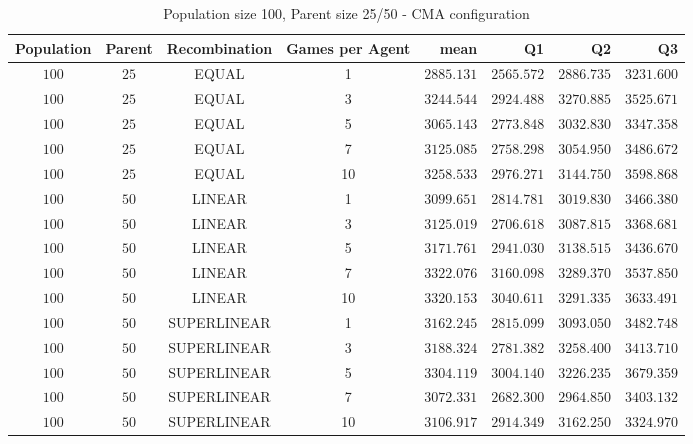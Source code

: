\begin{table}[H]
\centering
\small
\begin{tabular}{c c c c r r r r}
Population & Parent & Recombination & Games per Agent & mean & Q1 & Q2 & Q3\\
\hline
$100$ & $25$ & EQUAL & 1 & $2885.131$ & $2565.572$ & $2886.735$ & $3231.600$\\
\hdashline
$100$ & $25$ & EQUAL & 3 & $3244.544$ & $2924.488$ & $3270.885$ & $3525.671$\\
\hdashline
$100$ & $25$ & EQUAL & 5 & $3065.143$ & $2773.848$ & $3032.830$ & $3347.358$\\
$100$ & $25$ & EQUAL & 7 & $3125.085$ & $2758.298$ & $3054.950$ & $3486.672$\\
$100$ & $25$ & EQUAL & 10 & $3258.533$ & $2976.271$ & $3144.750$ & $3598.868$\\
$100$ & $50$ & LINEAR & 1 & $3099.651$ & $2814.781$ & $3019.830$ & $3466.380$\\
$100$ & $50$ & LINEAR & 3 & $3125.019$ & $2706.618$ & $3087.815$ & $3368.681$\\
$100$ & $50$ & LINEAR & 5 & $3171.761$ & $2941.030$ & $3138.515$ & $3436.670$\\
\hdashline
$100$ & $50$ & LINEAR & 7 & $3322.076$ & $3160.098$ & $3289.370$ & $3537.850$\\
\hdashline
$100$ & $50$ & LINEAR & 10 & $3320.153$ & $3040.611$ & $3291.335$ & $3633.491$\\
$100$ & $50$ & SUPERLINEAR & 1 & $3162.245$ & $2815.099$ & $3093.050$ & $3482.748$\\
$100$ & $50$ & SUPERLINEAR & 3 & $3188.324$ & $2781.382$ & $3258.400$ & $3413.710$\\
\hdashline
$100$ & $50$ & SUPERLINEAR & 5 & $3304.119$ & $3004.140$ & $3226.235$ & $3679.359$\\
\hdashline
$100$ & $50$ & SUPERLINEAR & 7 & $3072.331$ & $2682.300$ & $2964.850$ & $3403.132$\\
$100$ & $50$ & SUPERLINEAR & 10 & $3106.917$ & $2914.349$ & $3162.250$ & $3324.970$\\
\end{tabular}
\caption{Population size 100, Parent size 25/50 - CMA configuration}
\end{table}

\clearpage

